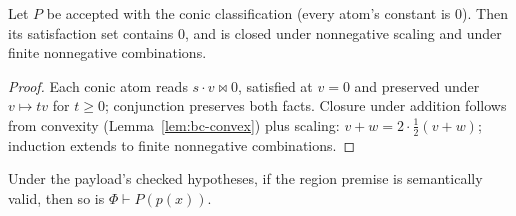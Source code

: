 \begin{blemma}\label{lem:bc-conic}
Let $P$ be accepted with the conic classification (every atom's
constant is $0$). Then its satisfaction set contains $0$, and is closed
under nonnegative scaling and under finite nonnegative combinations.
\end{blemma}
\begin{proof}
Each conic atom reads $s \cdot v \bowtie 0$, satisfied at $v = 0$ and
preserved under $v \mapsto t v$ for $t \geq 0$; conjunction preserves
both facts. Closure under addition follows from convexity
(Lemma~\ref{lem:bc-convex}) plus scaling:
$v + w = 2 \cdot \tfrac{1}{2}(v + w)$; induction extends to finite
nonnegative combinations.
\end{proof}

\begin{bthm}\label{thm:bc-sound}
Under the payload's checked hypotheses, if the region premise is
semantically valid, then so is $\Phi \vdash P(p(x))$.
\end{bthm}
